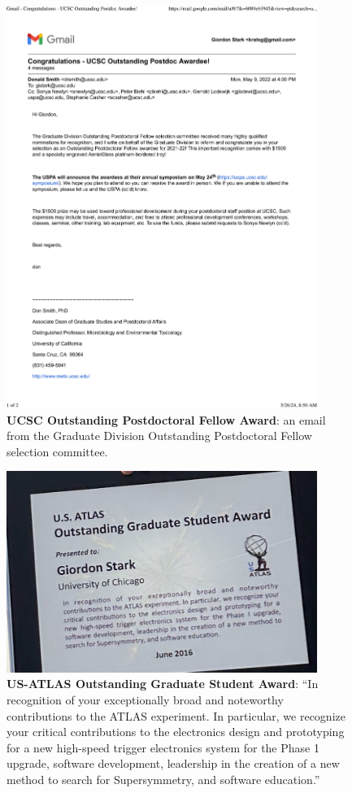 \begin{figure}[h!]
	\centering
	\caption{\textbf{UCSC Outstanding Postdoctoral Fellow Award}: an email from the Graduate Division Outstanding Postdoctoral Fellow selection committee.}
	\includegraphics[width=0.9\textwidth]{attachments/D-research/ucscOutstandingPostdocAward}
\end{figure}

\begin{figure}[h!]
	\centering
	\caption{\textbf{US-ATLAS Outstanding Graduate Student Award}: \enquote{In recognition of your exceptionally broad and noteworthy contributions to the ATLAS experiment. In particular, we recognize your critical contributions to the electronics design and prototyping for a new high-speed trigger electronics system for the Phase 1 upgrade, software development, leadership in the creation of a new method to search for Supersymmetry, and software education.}}
	\includegraphics[width=0.9\textwidth]{attachments/D-research/usatlasOutstandingGradStudent}
\end{figure}

